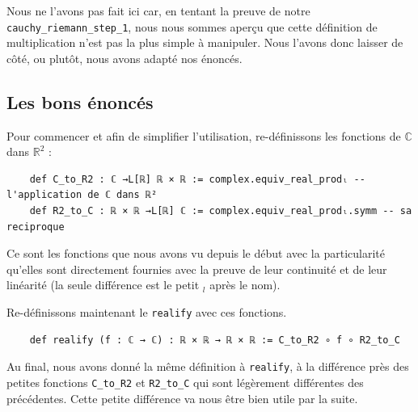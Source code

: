\documentclass[a4paper, 11pt, twoside]{report}
\newcommand\R{\mathbb{R}}
\newcommand\C{\mathbb{C}}
\begin{document}
Nous ne l'avons pas fait ici car, en tentant la preuve de notre \verb|cauchy_riemann_step_1|, nous nous sommes aperçu que cette définition de multiplication n'est pas la plus simple à manipuler. Nous l'avons donc laisser de côté, ou plutôt, nous avons adapté nos énoncés.

	\subsection{Les bons énoncés}
	
	Pour commencer et afin de simplifier l'utilisation, re-définissons les fonctions de $\C$ dans $\R^2$ :
	
\begin{lstlisting}
	def C_to_R2 : ℂ →L[ℝ] ℝ × ℝ := complex.equiv_real_prodₗ -- l'application de ℂ dans ℝ²
	def R2_to_C : ℝ × ℝ →L[ℝ] ℂ := complex.equiv_real_prodₗ.symm -- sa reciproque 
\end{lstlisting}

Ce sont les fonctions que nous avons vu depuis le début avec la particularité qu'elles sont directement fournies avec la preuve de leur continuité et de leur linéarité (la seule différence est le petit $_l$ après le nom). 

\medskip

Re-définissons maintenant le \verb|realify| avec ces fonctions. 

\begin{lstlisting}
	def realify (f : ℂ → ℂ) : ℝ × ℝ → ℝ × ℝ := C_to_R2 ∘ f ∘ R2_to_C  
\end{lstlisting}

Au final, nous avons donné la même définition à \verb|realify|, à la différence près des petites fonctions \verb|C_to_R2| et \verb|R2_to_C| qui sont légèrement différentes des précédentes. Cette petite différence va nous être bien utile par la suite.
\end{document}
